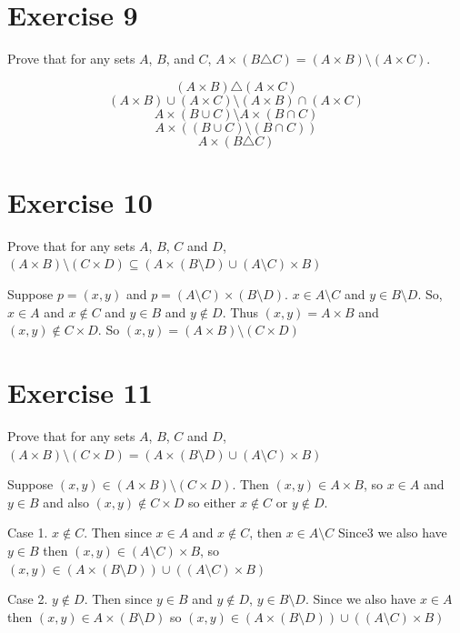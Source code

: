 \documentclass[11pt]{article}
\begin{document}
\section*{Exercise 9}

Prove that for any sets $A$, $B$, and $C$, 
$A \times (B \triangle C) = (A \times B) \setminus (A \times C)$.

$$(A \times B) \triangle (A \times C)$$
$$(A \times B) \cup (A \times C) \setminus (A \times B) \cap (A \times C)$$
$$A \times (B \cup C) \setminus A \times (B \cap C)$$
$$A \times ((B \cup C) \setminus (B \cap C))$$
$$A \times (B \triangle C)$$

\section*{Exercise 10}

Prove that for any sets $A$, $B$, $C$ and $D$, 
$(A \times B) \setminus (C \times D) \subseteq (A \times (B \setminus D) \cup (A \setminus C) \times B)$

Suppose $p = (x, y)$ and $p = (A \setminus C) \times (B \setminus D)$. 
$x \in A \setminus C$ and $y \in B \setminus D$. So, $x \in A$ and $x \notin C$
and $y \in B$ and $y \notin D$. Thus $(x, y) = A \times B$ and 
$(x, y) \notin C \times D$. So $(x, y) = (A \times B) \setminus (C \times D)$

\section*{Exercise 11}

Prove that for any sets $A$, $B$, $C$ and $D$, 
$(A \times B) \setminus (C \times D) = (A \times (B \setminus D) \cup (A \setminus C) \times B)$

Suppose $(x, y) \in (A \times B) \setminus (C \times D)$. Then $(x, y) \in A \times B$,
so $x \in A$ and $y \in B$ and also $(x, y) \notin C \times D$ so either 
$x \notin C$ or $y \notin D$.

Case 1. $x \notin C$. Then since $x \in A$ and $x \notin C$, then $x \in A \setminus C$
Since3 we also have $y \in B$ then $(x, y) \in (A \setminus C) \times B$, so 
$(x, y) \in (A \times (B \setminus D)) \cup ((A \setminus C) \times B)$

Case 2. $y \notin D$. Then since $y \in B$ and $y \notin D$, $y \in B \setminus D$.
Since we also have $x \in A$ then $(x, y) \in A \times (B \setminus D)$ so 
$(x, y) \in (A \times (B \setminus D)) \cup ((A \setminus C) \times B)$
\end{document}
